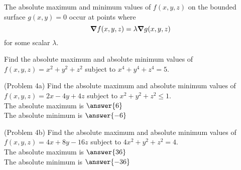 \documentclass[handout]{ximera}
\begin{document}
\begin{theorem}
The absolute maximum and minimum values of $f(x,y, z)$ on the bounded surface $g(x,y) = 0$ occur at 
points where 
\[
\boldsymbol\nabla f(x,y, z) = \lambda \boldsymbol\nabla g(x,y, z)
\]
for some scalar $\lambda$.
\end{theorem}

\begin{example}[Example 4]
Find the absolute maximum and absolute minimum values of $f(x,y, z) = x^2 + y^2 + z^2$ subject to $x^4 + y^4 + z^4  = 5$.\\
\end{example}

\begin{problem}(Problem 4a)
Find the absolute maximum and absolute minimum values of $f(x,y, z) = 2x  -4y  +4z$ subject to $x^2 + y^2 + z^2 \leq 1$.\\
The absolute maximum is $\answer{6}$\\
The absolute minimum is $\answer{-6}$
\end{problem}

\begin{problem}(Problem 4b)
Find the absolute maximum and absolute minimum values of $f(x,y, z) = 4x + 8y - 16z$ subject to $4x^2 + y^2 + z^2 = 4$.\\
The absolute maximum is $\answer{36}$\\
The absolute minimum is $\answer{-36}$
\end{problem}
\end{document}
